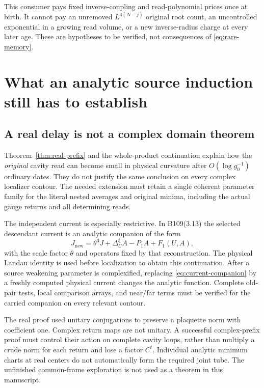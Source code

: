 This consumer pays fixed inverse-coupling and read-polynomial prices once at birth. It cannot pay an unremoved $L^{4(N-j)}$ original root count, an uncontrolled exponential in a growing read volume, or a new inverse-radius charge at every later age. These are hypotheses to be verified, not consequences of \eqref{eq:rare-memory}.

\section{What an analytic source induction still has to establish}
\label{sec:gates}

\subsection{A real delay is not a complex domain theorem}

Theorem~\ref{thm:real-prefix} and the whole-product continuation explain how the \emph{original} cavity read can become small in physical curvature after $O(\log g_0^{-1})$ ordinary dates. They do not justify the same conclusion on every complex localizer contour. The needed extension must retain a single coherent parameter family for the literal nested averages and original minima, including the actual gauge returns and all determining reads.

The independent current is especially restrictive. In B109(3.13) the selected descendant current is an analytic companion of the form
\begin{equation}\label{eq:current-companion}
 J_{\mathrm{new}}=\theta^3J+\Delta_U^\xi A-P_1A+F_1(U,A),
\end{equation}
with the scale factor $\theta$ and operators fixed by that reconstruction. The physical Landau identity is used before localization to obtain this continuation. After a source weakening parameter is complexified, replacing \eqref{eq:current-companion} by a freshly computed physical current changes the analytic function. Complete old-pair tests, local comparison arrays, and near/far terms must be verified for the carried companion on every relevant contour.

The real proof used unitary conjugations to preserve a plaquette norm with coefficient one. Complex return maps are not unitary. A successful complex-prefix proof must control their action on complete cavity loops, rather than multiply a crude norm for each return and lose a factor $C^t$. Individual analytic minimum charts at real centers do not automatically form the required joint tube. The unfinished common-frame exploration is not used as a theorem in this manuscript.

